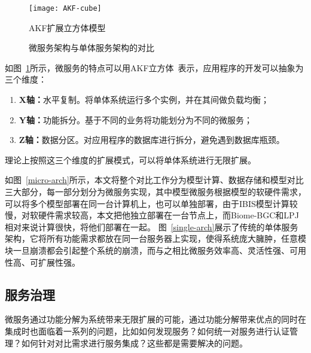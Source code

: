 \begin{figure}[!htbp]
    \centering
    \texttt{[image: AKF-cube]}
    \caption{AKF扩展立方体模型}
    \label{fig:AKF-cube}
\end{figure}

\begin{figure}[!htbp]
    \centering

    \hfill

    \caption{微服务架构与单体服务架构的对比}
    \label{fig:ms-server-microservice}
\end{figure}

如图~\ref{fig:AKF-cube}所示，微服务的特点可以用AKF立方体~\cite{abbott2009art}表示，应用程序的开发可以抽象为三个维度：

\begin{enumerate}[(1)]
    \item \textbf{X轴：}水平复制。将单体系统运行多个实例，并在其间做负载均衡；
    \item \textbf{Y轴：}功能拆分。基于不同的业务将功能划分为不同的微服务；
    \item \textbf{Z轴：}数据分区。对应用程序的数据库进行拆分，避免遇到数据库瓶颈。
\end{enumerate}

理论上按照这三个维度的扩展模式，可以将单体系统进行无限扩展。

如图~\ref{micro-arch}所示，本文将整个对比工作分为模型计算、数据存储和模型对比三大部分，每一部分划分为微服务实现，其中模型微服务根据模型的软硬件需求，可以将多个模型部署在同一台计算机上，也可以单独部署，由于IBIS模型计算较慢，对软硬件需求较高，本文把他独立部署在一台节点上，而Biome-BGC和LPJ相对来说计算很快，将他们部署在一起。
图~\ref{single-arch}展示了传统的单体服务架构，它将所有功能需求都放在同一台服务器上实现，使得系统庞大臃肿，任意模块一旦崩溃都会引起整个系统的崩溃，而与之相比微服务效率高、灵活性强、可用性高、可扩展性强。

\subsection{服务治理}
微服务通过功能分解为系统带来无限扩展的可能，通过功能分解带来优点的同时在集成时也面临着一系列的问题，比如如何发现服务？如何统一对服务进行认证管理？如何针对对比需求进行服务集成？这些都是需要解决的问题。
